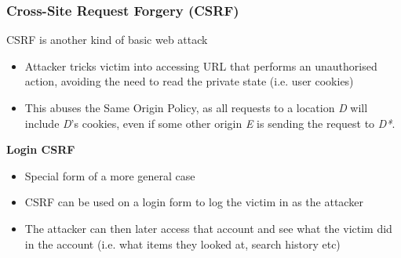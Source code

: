\documentclass{article}
\begin{document}
\begin{itemize}
\subsubsection{Cross-Site Request Forgery (CSRF)}
CSRF is another kind of basic web attack
\begin{itemize}
    \item Attacker tricks victim into accessing URL that performs an unauthorised action, avoiding the need to read the private state (i.e. user cookies)
    \item This abuses the Same Origin Policy, as all requests to a location \textit{D} will include \textit{D}'s cookies, even if some other origin \textit{E} is sending the request to \textit{D*}.
\end{itemize}
\textbf{Login CSRF}
\begin{itemize}
    \item Special form of a more general case
    \item CSRF can be used on a login form to log the victim in as the attacker
    \item The attacker can then later access that account and see what the victim did in the account (i.e. what items they looked at, search history etc)
\end{itemize}


\end{itemize}
\end{document}
